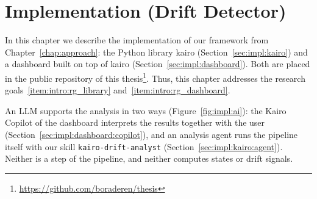 \chapter{Implementation (Drift Detector)}
\label{chap:impl}

In this chapter we describe the implementation of our framework from Chapter~\ref{chap:approach}: the Python library kairo (Section~\ref{sec:impl:kairo}) and a dashboard built on top of kairo (Section~\ref{sec:impl:dashboard}). Both are placed in the public repository of this thesis\footnote{\url{https://github.com/boraderen/thesis}}. Thus, this chapter addresses the research goals~\ref{item:intro:rg_library} and~\ref{item:intro:rg_dashboard}.

An LLM supports the analysis in two ways (Figure~\ref{fig:impl:ai}): the Kairo Copilot of the dashboard interprets the results together with the user (Section~\ref{sec:impl:dashboard:copilot}), and an analysis agent runs the pipeline itself with our skill \texttt{kairo-drift-analyst} (Section~\ref{sec:impl:kairo:agent}). Neither is a step of the pipeline, and neither computes states or drift signals.

